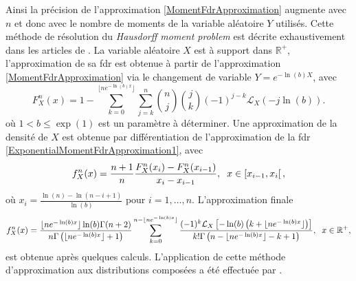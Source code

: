 Ainsi la précision de l\rq{}approximation \eqref{MomentFdrApproximation} augmente avec $n$ et donc avec le nombre de moments de la variable aléatoire $Y$ utilisés. Cette méthode de résolution du \textit{Hausdorff moment problem} est décrite exhaustivement dans les articles de \citet{Mn08a,Mn08b}. La variable aléatoire $X$ est à support dans $\mathbb{R}^{+}$, l\rq{}approximation de sa \gls{fdr} est obtenue à partir de l\rq{}approximation \eqref{MomentFdrApproximation} via le changement de variable $Y=e^{-\ln(b)X}$, avec
\begin{equation}\label{ExponentialMomentFdrApproximation1}
F_{X}^{n}(x)=1-\sum^{\lfloor{ne^{-\ln(b)x}}\rfloor}_{k=0}\sum_{j=k}^{n}\binom{n}{j}\binom{j}{k}(-1)^{j-k}\mathcal{L}_{X}\left(-j\ln(b)\right).
\end{equation}
où $1<b\leq \exp(1)$ est un paramètre à déterminer. Une approximation de la densité de $X$ est obtenue par différentiation de l\rq{}approximation de la \gls{fdr} \eqref{ExponentialMomentFdrApproximation1}, avec
\begin{equation}\label{ExponentialMomentPDFApproximation}
f_{X}^{n}(x)=\frac{n+1}{n}\frac{F_{X}^{n}(x_{i})-F_{X}^{n}(x_{i-1})}{x_{i}-x_{i-1}}, \hspace{0.2cm}x\in \left[x_{i-1},x_{i}\right[,
\end{equation}
où $x_{i}=\frac{\ln(n)-\ln(n-i+1)}{\ln(b)}$ pour $i=1,\ldots,n$. L\rq{}approximation finale
\begin{equation}
f_{X}^{n}(x)=\frac{\lfloor{ne^{-\ln(b)x}}\rfloor\ln(b)\Gamma(n+2)}{n\Gamma\left(\lfloor{ne^{-\ln(b)x}}\rfloor+1\right)}
\sum^{n-\lfloor{ne^{-\ln(b)x}}\rfloor}_{k=0}\frac{(-1)^{k}\mathcal{L}_{X}\left[-\ln(b)\left(k+\lfloor{ne^{-\ln(b)x}}\rfloor\right)\right]}{k!\Gamma\left(n-\lfloor{ne^{-\ln(b)x}}\rfloor-k+1\right)},\hspace{0.2cm}x\in\mathbb{R}^{+},
\end{equation}
est obtenue après quelques calculs. L\rq{}application de cette méthode d\rq{}approximation aux distributions composées a été effectuée par \citet{MnSa13}.
